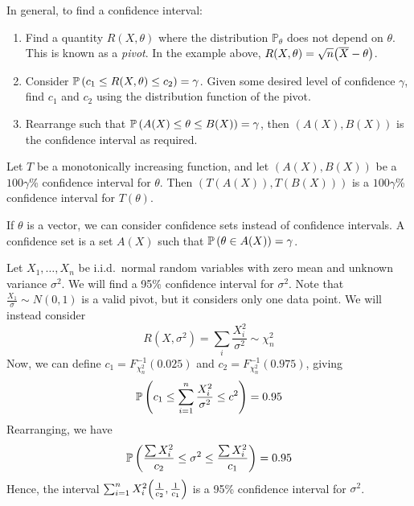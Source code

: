 \begin{remark}
	In general, to find a confidence interval:
	\begin{enumerate}
		\item Find a quantity \( R(X,\theta) \) where the distribution \( \mathbb P_\theta \) does not depend on \( \theta \).
		      This is known as a \textit{pivot}.
		      In the example above, \( R(X,\theta) = \sqrt{n}\qty(\overline X - \theta) \).
		\item Consider \( \mathbb{P}\left({c_1 \leq R(X,\theta) \leq c_2}\right) = \gamma \).
		      Given some desired level of confidence \( \gamma \), find \( c_1 \) and \( c_2 \) using the distribution function of the pivot.
		\item Rearrange such that \( \mathbb{P}\left({A(X) \leq \theta \leq B(X)}\right) = \gamma \), then \( (A(X), B(X)) \) is the confidence interval as required.
	\end{enumerate}
\end{remark}
\begin{proposition}
	Let \( T \) be a monotonically increasing function, and let \( (A(X), B(X)) \) be a \( 100 \gamma \)\% confidence interval for \( \theta \).
	Then \( (T(A(X)), T(B(X))) \) is a \( 100 \gamma \)\% confidence interval for \( T(\theta) \).
\end{proposition}
\begin{remark}
	If \( \theta \) is a vector, we can consider confidence sets instead of confidence intervals.
	A confidence set is a set \( A(X) \) such that \( \mathbb{P}\left({\theta \in A(X)}\right) = \gamma \).
\end{remark}
\begin{example}
	Let \( X_1, \dots, X_n \) be i.i.d.\ normal random variables with zero mean and unknown variance \( \sigma^2 \).
	We will find a 95\% confidence interval for \( \sigma^2 \).
	Note that \( \frac{X_1}{\sigma} \sim N(0,1) \) is a valid pivot, but it considers only one data point.
	We will instead consider
	\[
		R(X, \sigma^2) = \sum_i \frac{X_i^2}{\sigma^2} \sim \chi^2_n
	\]
	Now, we can define \( c_1 = F_{\chi^2_n}^{-1}(0.025) \) and \( c_2 = F_{\chi^2_n}^{-1}(0.975) \), giving
	\[
		\mathbb{P}\left({c_1 \leq \sum_{i=1}^n \frac{X_i^2}{\sigma^2} \leq c^2}\right) = 0.95
	\]
	Rearranging, we have
	\[
		\mathbb{P}\left({\frac{\sum X_i^2}{c_2} \leq \sigma^2 \leq \frac{\sum X_i^2}{c_1}}\right) = 0.95
	\]
	Hence, the interval \( \sum_{i=1}^n X_i^2 \qty(\frac{1}{c_2}, \frac{1}{c_1}) \) is a 95\% confidence interval for \( \sigma^2 \).
\end{example}
